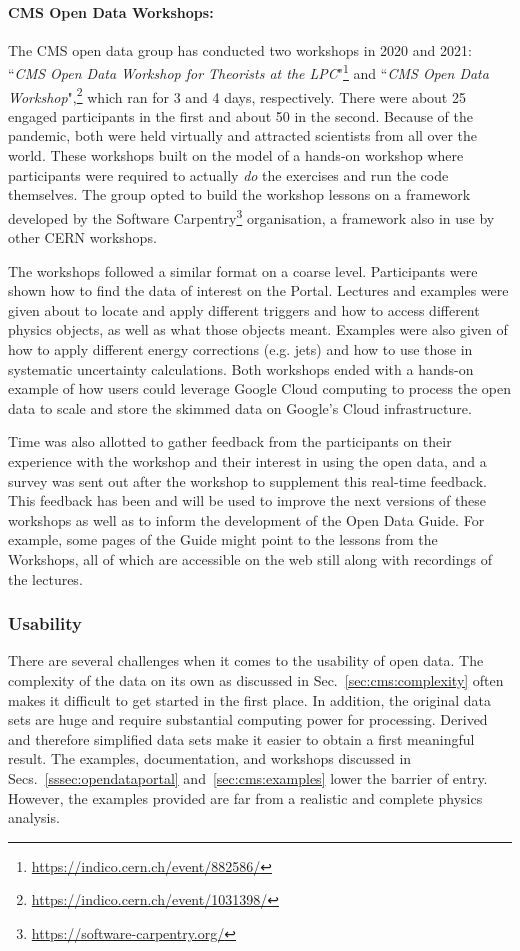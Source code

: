 \documentclass[10pt]{article}
\begin{document}
\paragraph{CMS Open Data Workshops:}
%
The CMS open data group has conducted two workshops in 2020 and 2021: ``{\it CMS Open Data Workshop for Theorists at the LPC}"\footnote{\url{https://indico.cern.ch/event/882586/}} and ``{\it CMS Open Data Workshop}",\footnote{\url{https://indico.cern.ch/event/1031398/}} which ran for 3 and 4 days, respectively. There were about 25 engaged participants in the first and about 50 in the second. Because of the pandemic, both were held virtually and attracted scientists from all over the world. These workshops built on the model of a hands-on workshop where participants were required to actually {\it do} the exercises and run the code themselves. The group opted to build the workshop lessons on a framework developed by the Software Carpentry\footnote{\url{https://software-carpentry.org/}} organisation, a framework also in use by other CERN workshops. 

The workshops followed a similar format on a coarse level. Participants were shown how to find the data of interest on the Portal. Lectures and examples were given about to locate and apply different triggers and how to access different physics objects, as well as what those objects meant. Examples were also given of how to apply different energy corrections (e.g. jets) and how to use those in systematic uncertainty calculations. Both workshops ended with a hands-on example of how users could leverage Google Cloud computing to process the open data to scale and store the skimmed data on Google's Cloud infrastructure. 

Time was also allotted to gather feedback from the participants on their experience with the workshop and their interest in using the open data, and a survey was sent out after the workshop to supplement this real-time feedback. This feedback has been and will be used to improve the next versions of these workshops as well as to inform the development of the Open Data Guide. For example, some pages of the Guide might point to the lessons from the Workshops, all of which are accessible on the web still along with recordings of the lectures. 

\subsubsection{Usability}
\label{sec:cms:usability}
%
There are several challenges when it comes to the usability of open data.
The complexity of the data on its own as discussed in Sec.~\ref{sec:cms:complexity} often makes it difficult to get started in the first place.
In addition, the original data sets are huge and require substantial computing power for processing.
Derived and therefore simplified data sets make it easier to obtain a first meaningful result.
The examples, documentation, and workshops discussed in Secs.~\ref{sssec:opendataportal} and~\ref{sec:cms:examples} lower the barrier of entry.
However, the examples provided are far from a realistic and complete physics analysis.
\end{document}
